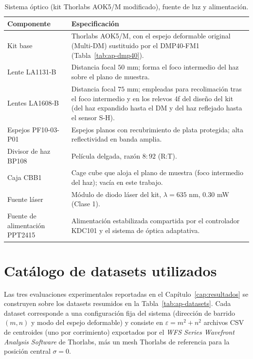 \documentclass[letterpaper,12pt,oneside]{book}
\begin{document}
\begin{table}[htbp]
\centering
\caption{Sistema óptico (kit Thorlabs AOK5/M modificado), fuente de luz y alimentación.}
\label{tab:ap-optico}
\begin{tabularx}{\textwidth}{@{}l >{\raggedright\arraybackslash}X@{}}
\hline
\textbf{Componente} & \textbf{Especificación} \\
\hline
Kit base & Thorlabs AOK5/M, con el espejo deformable original (Multi-DM) sustituido por el DMP40-FM1 (Tabla~\ref{tab:ap-dmp40}). \\
Lente LA1131-B & Distancia focal $50$ mm; forma el foco intermedio del haz sobre el plano de muestra. \\
Lentes LA1608-B & Distancia focal $75$ mm; empleadas para recolimación tras el foco intermedio y en los relevos 4f del diseño del kit (del haz expandido hasta el DM y del haz reflejado hasta el sensor S-H). \\
Espejos PF10-03-P01 & Espejos planos con recubrimiento de plata protegida; alta reflectividad en banda amplia. \\
Divisor de haz BP108 & Película delgada, razón $8{:}92$ (R:T). \\
Caja CBB1 & Cage cube que aloja el plano de muestra (foco intermedio del haz); vacía en este trabajo. \\
Fuente láser & Módulo de diodo láser del kit, $\lambda = 635$ nm, $0.30$ mW (Clase 1). \\
Fuente de alimentación PPT2415 & Alimentación estabilizada compartida por el controlador KDC101 y el sistema de óptica adaptativa. \\
\hline
\end{tabularx}
\end{table}

\chapter{Catálogo de datasets utilizados}\label{ap:datasets}

Las tres evaluaciones experimentales reportadas en el Capítulo~\ref{cap:resultados} se
construyen sobre los datasets resumidos en la Tabla~\ref{tab:ap-datasets}. Cada dataset
corresponde a una configuración fija del sistema (dirección de barrido $(m,n)$ y modo del
espejo deformable) y consiste en $\varepsilon = m^2 + n^2$ archivos CSV de centroides (uno
por corrimiento) exportados por el \textit{WFS Series Wavefront Analysis Software} de
Thorlabs, más un mesh Thorlabs de referencia para la posición central $\sigma = 0$.
\end{document}

